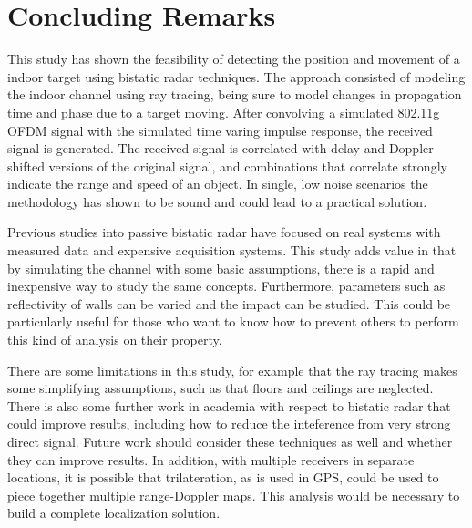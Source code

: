 \documentclass[article,11pt,onecolumn,final]{IEEEtran}
\begin{document}
\section{Concluding Remarks}
This study has shown the feasibility of detecting the position and movement of a indoor target using bistatic
radar techniques. The approach consisted of modeling the indoor channel using ray tracing, being sure to 
model changes in propagation time and phase due to a target moving. After convolving a simulated 802.11g
OFDM signal with the simulated time varing impulse response, the received signal is generated. The received
signal is correlated with delay and Doppler shifted versions of the original signal, and combinations that correlate
strongly indicate the range and speed of an object. In single, low noise scenarios the methodology has shown
to be sound and could lead to a practical solution.

Previous studies into passive bistatic radar have focused on real systems with measured data and expensive
acquisition systems. This study adds value in that by simulating the channel with some basic assumptions, there 
is a rapid and inexpensive way to study the same concepts. Furthermore, parameters such as reflectivity of
walls can be varied and the impact can be studied. This could be particularly useful for those who want to know
how to prevent others to perform this kind of analysis on their property.

There are some limitations in this study, for example that the ray tracing makes some simplifying assumptions, 
such as that floors and ceilings are neglected. There is also some further work in academia with respect to bistatic
radar that could improve results, including how to reduce the inteference from very strong direct signal. Future work
should consider these techniques as well and whether they can improve results. In addition, with multiple receivers
in separate locations, it is possible that trilateration, as is used in GPS, could be used to piece together multiple
range-Doppler maps. This analysis would be necessary to build a complete localization solution.
\end{document}
